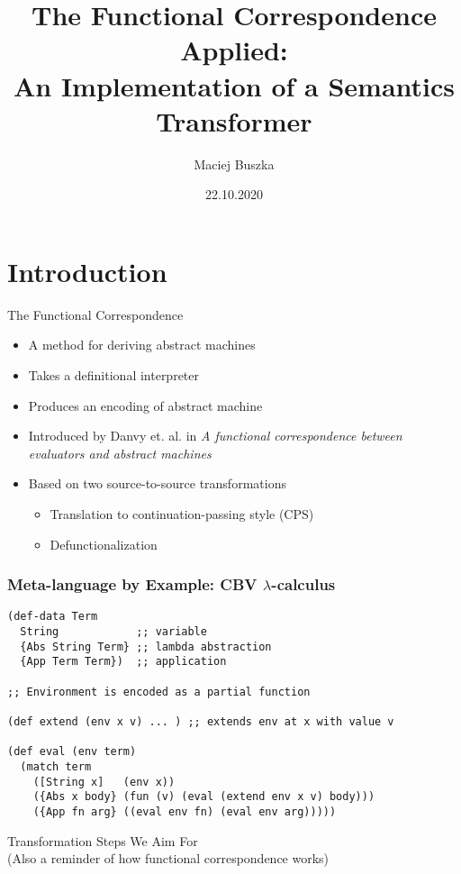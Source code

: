 \documentclass{beamer}
\title[The Functional Correspondence Applied]{The Functional Correspondence Applied:\\ An Implementation of a Semantics Transformer}
\author[Maciej Buszka]{Maciej Buszka}
\institute[II UWr]{Instytut Informatyki UWr}
\date{22.10.2020}
\newcommand{\LC}{\(\lambda\)-calculus}
\begin{document}
\begin{frame}
  \titlepage
\end{frame}



\section{Introduction}
\begin{frame}{The Functional Correspondence}
  \begin{itemize}
    \item A method for deriving abstract machines\pause
    \item Takes a definitional interpreter
    \item Produces an encoding of abstract machine\pause
    \item Introduced by Danvy et. al. in \textit{A functional correspondence between evaluators and abstract machines}
    \pause
    \item Based on two source-to-source transformations
    \begin{itemize}
      \item Translation to continuation-passing style (CPS)
      \item Defunctionalization
    \end{itemize}
  \end{itemize}
\end{frame}

\begin{frame}[fragile]
  \frametitle{Meta-language by Example: CBV \LC{}}
  \begin{lstlisting}
(def-data Term
  String            ;; variable
  {Abs String Term} ;; lambda abstraction
  {App Term Term})  ;; application

;; Environment is encoded as a partial function

(def extend (env x v) ... ) ;; extends env at x with value v

(def eval (env term)
  (match term
    ([String x]   (env x))
    ({Abs x body} (fun (v) (eval (extend env x v) body)))
    ({App fn arg} ((eval env fn) (eval env arg)))))
  \end{lstlisting}
\end{frame}

\begin{frame}
  \begin{center}
    \LARGE{Transformation Steps We Aim For}\\
    \tiny{(Also a reminder of how functional correspondence works)}
  \end{center}
\end{frame}
\end{document}
